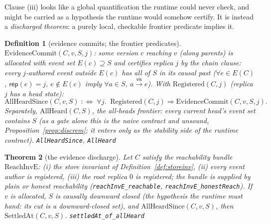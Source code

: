 \documentclass[11pt]{article}
\newtheorem{theorem}{Theorem}[section]
\newtheorem{definition}[theorem]{Definition}
\newcommand{\vis}{\xrightarrow{\mathsf{vis}}}
\newcommand{\lean}[1]{\texttt{#1}}
\begin{document}
Clause (iii) looks like a global quantification the
runtime could never check, and might be carried as a
hypothesis the runtime would somehow certify. It is instead a
\emph{discharged theorem}: a purely local, checkable frontier predicate
implies it.

\begin{definition}[evidence commits; the frontier predicates]
\label{def:evidence}
$\mathrm{EvidenceCommit}(C, v, S, j)$: some version $c$ reaching $v$
(along parents) is allocated with event set $E(c) \supseteq S$ and
certifies replica $j$ by the chain clause: every $j$-authored event
outside $E(c)$ has all of $S$ in its causal past
($\forall e \in E(C)$, $\mathsf{rep}(e) = j$, $e \notin E(c)$ imply
$\forall a \in S$, $a \vis e$). With
$\mathrm{Registered}(C, j)$ (replica $j$ has a head state):
\[
  \mathrm{AllHeardSince}(C, v, S) \;:\Longleftrightarrow\;
  \forall j.\;\; \mathrm{Registered}(C, j) \Rightarrow
  \mathrm{EvidenceCommit}(C, v, S, j) .
\]
Separately, $\mathrm{AllHeard}(C, S)$, the \emph{all-heads frontier}:
every current head's event set contains $S$ (as a gate alone this is
the naive contract and unsound, Proposition~\ref{prop:discrem}; it
enters only as the stability side of the runtime contract).
\hfill\lean{AllHeardSince}, \lean{AllHeard}
\end{definition}

\begin{theorem}[the evidence discharge]
\label{thm:evidence}
Let $C$ satisfy the reachability bundle $\mathrm{ReachInvE}$: (i) the
store invariant of Definition~\ref{def:storeinv}, (ii) every event
author is registered, (iii) the root replica $0$ is registered; the
bundle is supplied by plain or honest reachability
(\lean{reachInvE\_reachable}, \lean{reachInvE\_honestReach}). If $v$ is
allocated, $S$ is causally downward closed (the hypothesis the runtime
must hand: its cut is a downward-closed set), and
$\mathrm{AllHeardSince}(C, v, S)$, then $\mathrm{SettledAt}(C, v, S)$.
\hfill\lean{settledAt\_of\_allHeard}
\end{theorem}
\end{document}
